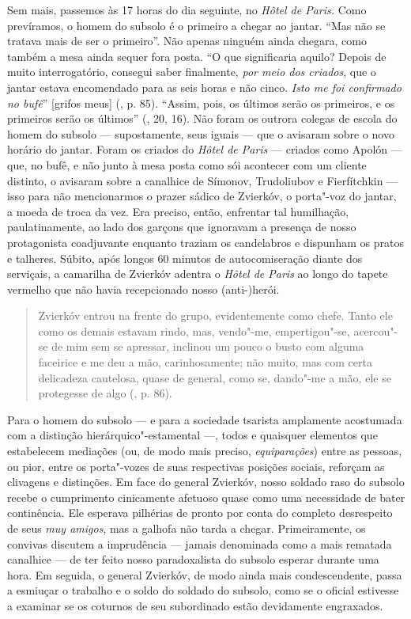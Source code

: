 Sem mais, passemos às 17 horas do dia seguinte, no \emph{Hôtel de
Paris.} Como prevíramos, o homem do subsolo é o primeiro a chegar ao
jantar. ``Mas não se tratava mais de ser o primeiro''. Não apenas
ninguém ainda chegara, como também a mesa ainda sequer fora posta. ``O
que significaria aquilo? Depois de muito interrogatório, consegui saber
finalmente, \emph{por meio dos criados}, que o jantar estava encomendado
para as seis horas e não cinco. \emph{Isto me foi confirmado no bufê}''
{[}grifos meus{]} (, p. 85). ``Assim, pois, os últimos serão os
primeiros, e os primeiros serão os últimos'' (, 20, 16). Não foram
os outrora colegas de escola do homem do subsolo --- supostamente, seus
iguais --- que o avisaram sobre o novo horário do jantar. Foram os
criados do \emph{Hôtel de Paris} --- criados como Apolón --- que, no bufê,
e não junto à mesa posta como sói acontecer com um cliente distinto, o
avisaram sobre a canalhice de Símonov, Trudoliubov e Fierfítchkin ---
isso para não mencionarmos o prazer sádico de Zvierkóv, o porta"-voz do
jantar, a moeda de troca da vez. Era preciso, então, enfrentar tal
humilhação, paulatinamente, ao lado dos garçons que ignoravam a presença
de nosso protagonista coadjuvante enquanto traziam os candelabros e
dispunham os pratos e talheres. Súbito, após longos 60 minutos de
autocomiseração diante dos serviçais, a camarilha de Zvierkóv adentra o
\emph{Hôtel de Paris} ao longo do tapete vermelho que não havia
recepcionado nosso \mbox{(anti-)herói}.

\begin{quote}
Zvierkóv entrou na frente do grupo, evidentemente como chefe. Tanto ele
como os demais estavam rindo, mas, vendo"-me, empertigou"-se, acercou"-se
de mim sem se apressar, inclinou um pouco o busto com alguma faceirice e
me deu a mão, carinhosamente; não muito, mas com certa delicadeza
cautelosa, quase de general, como se, dando"-me a mão, ele se protegesse
de algo (, p. 86).
\end{quote}

Para o homem do subsolo --- e para a sociedade tsarista amplamente
acostumada com a distinção hierárquico"-estamental ---, todos e quaisquer
elementos que estabelecem mediações (ou, de modo mais preciso,
\emph{equiparações}) entre as pessoas, ou pior, entre os porta"-vozes de
suas respectivas posições sociais, reforçam as clivagens e distinções.
Em face do general Zvierkóv, nosso soldado raso do subsolo recebe o
cumprimento cinicamente afetuoso quase como uma necessidade de bater
continência. Ele esperava pilhérias de pronto por conta do completo
desrespeito de seus \emph{muy amigos}, mas a galhofa não tarda a chegar.
Primeiramente, os convivas discutem a imprudência --- jamais denominada
como a mais rematada canalhice --- de ter feito nosso paradoxalista do
subsolo esperar durante uma hora. Em seguida, o general Zvierkóv, de
modo ainda mais condescendente, passa a esmiuçar o trabalho e o soldo do
soldado do subsolo, como se o oficial estivesse a examinar se os
coturnos de seu subordinado estão devidamente engraxados.

